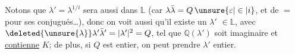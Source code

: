 Notons que $\lambda'=\lambda^{1/i}$ sera aussi dans $\mathbb L$ (car $\lambda\bar\lambda=Q\,\unsure{\varepsilon|\in|i}$, et
de $=$ pour ses conjugués\ldots), donc on voit aussi qu'il
existe un $\lambda'$  $\in\mathbb L$, avec $\deleted{\unsure{\lambda}}\lambda'\bar\lambda'=|\lambda'|^2=Q$, tel que
$\mathbb Q(\lambda')$ soit   imaginaire et \uline{contienne} $K$; de plus, si
$Q$ est entier, on peut prendre $\lambda'$ entier.
